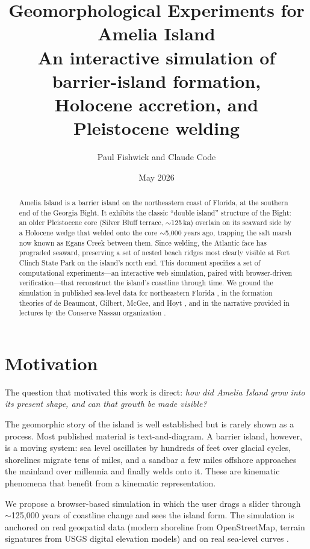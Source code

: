 \documentclass[11pt]{article}
\title{\textcolor{ocean}{\Huge Geomorphological Experiments for Amelia Island}\\[8pt]
\large An interactive simulation of barrier-island formation,\\
Holocene accretion, and Pleistocene welding}
\author{Paul Fishwick and Claude Code}
\date{May 2026}
\begin{document}
\maketitle

\begin{abstract}
\noindent
Amelia Island is a barrier island on the northeastern coast of Florida, at the southern
end of the Georgia Bight. It exhibits the classic ``double island'' structure of the
Bight: an older Pleistocene core (Silver Bluff terrace, $\sim$125\,ka) overlain on its
seaward side by a Holocene wedge that welded onto the core $\sim$5{,}000 years ago,
trapping the salt marsh now known as Egans Creek between them. Since welding, the
Atlantic face has prograded seaward, preserving a set of nested beach ridges most
clearly visible at Fort Clinch State Park on the island's north end. This document
specifies a set of computational experiments---an interactive web simulation, paired
with browser-driven verification---that reconstruct the island's coastline through
time. We ground the simulation in published sea-level data for northeastern Florida
\cite{hawkes2016}, in the formation theories of de Beaumont, Gilbert, McGee, and
Hoyt \cite{hoyt1967}, and in the narrative provided in lectures by the
Conserve Nassau organization \cite{cn_hopf,cn_dunes1,cn_dunes2}.
\end{abstract}

\tableofcontents
\newpage

\section{Motivation}

The question that motivated this work is direct: \emph{how did Amelia Island grow
into its present shape, and can that growth be made visible?}

The geomorphic story of the island is well established but is rarely shown as a
process. Most published material is text-and-diagram. A barrier island, however, is
a moving system: sea level oscillates by hundreds of feet over glacial cycles,
shorelines migrate tens of miles, and a sandbar a few miles offshore approaches the
mainland over millennia and finally welds onto it. These are kinematic phenomena
that benefit from a kinematic representation.

We propose a browser-based simulation in which the user drags a slider through
$\sim$125{,}000 years of coastline change and sees the island form. The simulation
is anchored on real geospatial data (modern shoreline from OpenStreetMap, terrain
signatures from USGS digital elevation models) and on real sea-level curves
\cite{hawkes2016,engelhart2012,toscano2003}.
\end{document}
